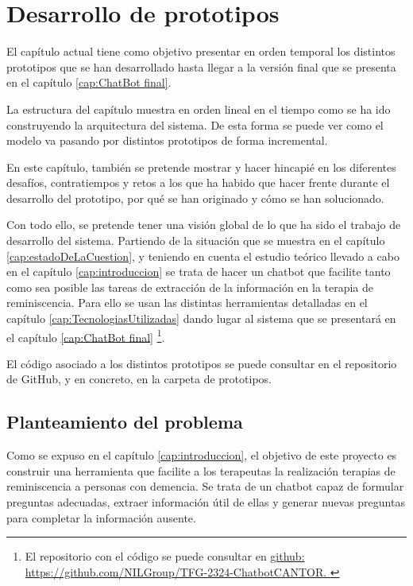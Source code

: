 \chapter{Desarrollo de prototipos}
\label{cap:Desarrollo de prototipos}

El capítulo actual tiene como objetivo presentar en orden temporal los distintos prototipos que se han desarrollado hasta llegar a la versión final que se presenta en el capítulo \ref{cap:ChatBot final}. 

La estructura del capítulo  muestra en orden lineal en el tiempo como se ha ido construyendo la arquitectura del sistema. De esta forma se puede ver como el modelo va pasando por distintos prototipos de forma incremental. 

En este capítulo, también se pretende mostrar y hacer hincapié en los diferentes desafíos, contratiempos y retos a los que ha habido que hacer frente durante el desarrollo del prototipo, por qué se han originado y cómo se han solucionado. 

Con todo ello, se pretende tener una visión global de lo que ha sido el trabajo de desarrollo del sistema. Partiendo de la situación que se muestra en el capítulo \ref{cap:estadoDeLaCuestion}, y teniendo en cuenta el estudio teórico llevado a cabo en el capítulo \ref{cap:introduccion} se trata de hacer un chatbot que facilite tanto como sea posible las tareas de extracción de la información en la terapia de reminiscencia. Para ello se usan las distintas herramientas detalladas en el capítulo \ref{cap:TecnologiasUtilizadas} dando lugar al sistema que se presentará en el capítulo \ref{cap:ChatBot final} \footnote{El repositorio con el código se puede consultar en \href{ GitHub}{github:\\
		https://github.com/NILGroup/TFG-2324-ChatbotCANTOR. }}. 


El código asociado a los distintos prototipos se puede consultar en el repositorio de GitHub, y en concreto, en la carpeta de prototipos. 

\section{Planteamiento del problema}
Como se expuso en el capítulo \ref{cap:introduccion}, el objetivo de este proyecto es construir una herramienta que facilite a los terapeutas la realización terapias de reminiscencia a personas con demencia. Se trata de un chatbot capaz de formular preguntas adecuadas, extraer información útil de ellas y generar nuevas preguntas para completar la información ausente. 

